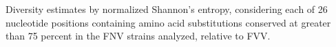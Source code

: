 \documentclass{report}
\begin{document}
\begin{table}
	
	\centering
	\caption{Diversity estimates by normalized Shannon's entropy, considering each of 26 nucleotide positions 
		containing amino acid substitutions conserved at greater than 75 percent in the FNV strains analyzed, relative
		to FVV.}
		\begin{ThreePartTable}


		
		\begin{tablenotes}
			\item[]
		\end{tablenotes}
		\end{ThreePartTable}
		\label{my-label}
\end{table}
\end{document}
